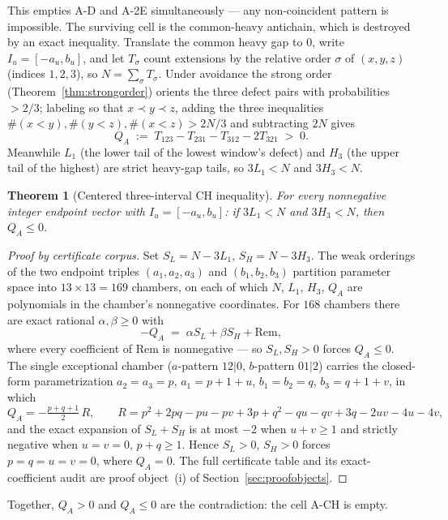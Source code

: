 \documentclass[11pt]{article}
\newtheorem{theorem}{Theorem}[section]
\theoremstyle{definition}
\theoremstyle{remark}
\begin{document}
This empties A-D and A-2E simultaneously --- any non-coincident pattern is impossible.
The surviving cell is the common-heavy antichain, which is destroyed by an exact
inequality. Translate the common heavy gap to $0$, write $I_u=[-a_u,b_u]$, and let
$T_{\sigma}$ count extensions by the relative order $\sigma$ of $(x,y,z)$ (indices
$1,2,3$), so $N=\sum_\sigma T_\sigma$. Under avoidance the strong order
(Theorem~\ref{thm:strongorder}) orients the three defect pairs with probabilities
$>2/3$; labeling so that $x\prec y\prec z$, adding the three inequalities
$\#(x<y),\#(y<z),\#(x<z)>2N/3$ and subtracting $2N$ gives
\[
Q_A\;:=\;T_{123}-T_{231}-T_{312}-2T_{321}\;>\;0 .
\]
Meanwhile $L_1$ (the lower tail of the lowest window's defect) and $H_3$ (the upper tail
of the highest) are strict heavy-gap tails, so $3L_1<N$ and $3H_3<N$.

\begin{theorem}[Centered three-interval CH inequality]\label{thm:CH}
For every nonnegative integer endpoint vector with $I_u=[-a_u,b_u]$: if $3L_1<N$ and
$3H_3<N$, then $Q_A\le0$.
\end{theorem}

\begin{proof}[Proof by certificate corpus]
Set $S_L=N-3L_1$, $S_H=N-3H_3$. The weak orderings of the two endpoint triples
$(a_1,a_2,a_3)$ and $(b_1,b_2,b_3)$ partition parameter space into $13\times13=169$
chambers, on each of which $N$, $L_1$, $H_3$, $Q_A$ are polynomials in the chamber's
nonnegative coordinates. For $168$ chambers there are exact rational $\alpha,\beta\ge0$
with
\[
-Q_A\;=\;\alpha S_L+\beta S_H+\mathrm{Rem},
\]
where every coefficient of $\mathrm{Rem}$ is nonnegative --- so $S_L,S_H>0$ forces
$Q_A\le0$. The single exceptional chamber ($a$-pattern $12|0$, $b$-pattern $01|2$)
carries the closed-form parametrization $a_2=a_3=p$, $a_1=p+1+u$, $b_1=b_2=q$,
$b_3=q+1+v$, in which
\[
Q_A=-\tfrac{p+q+1}{2}\,R,\qquad
R=p^2+2pq-pu-pv+3p+q^2-qu-qv+3q-2uv-4u-4v,
\]
and the exact expansion of $S_L+S_H$ is at most $-2$ when $u+v\ge1$ and strictly
negative when $u=v=0$, $p+q\ge1$. Hence $S_L>0$, $S_H>0$ forces $p=q=u=v=0$, where
$Q_A=0$. The full certificate table and its exact-coefficient audit are proof
object~(i) of Section~\ref{sec:proofobjects}.
\end{proof}

Together, $Q_A>0$ and $Q_A\le0$ are the contradiction: the cell A-CH is empty.
\end{document}
